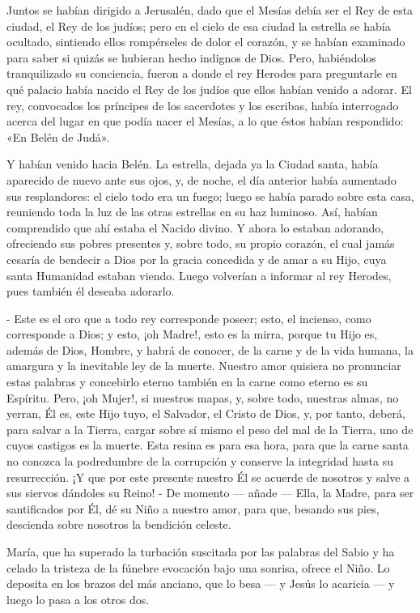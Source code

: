 \documentclass[12pt]{book} %
\begin{document}
Juntos se habían dirigido a Jerusalén, dado que el Mesías debía ser el Rey de esta ciudad, el Rey de los judíos; pero en el cielo de esa ciudad la estrella se había ocultado, sintiendo ellos rompérseles de dolor el corazón, y se habían examinado para saber si quizás se hubieran hecho indignos de Dios. Pero, habiéndolos tranquilizado su conciencia, fueron a donde el rey Herodes para preguntarle en qué palacio había nacido el Rey de los judíos que ellos habían venido a adorar. El rey, convocados los príncipes de los sacerdotes y los escribas, había interrogado acerca del lugar en que podía nacer el Mesías, a lo que éstos habían respondido: «En Belén de Judá». 

Y habían venido hacia Belén. La estrella, dejada ya la Ciudad santa, había aparecido de nuevo ante sus ojos, y, de noche, el día anterior había aumentado sus resplandores: el cielo todo era un fuego; luego se había parado sobre esta casa, reuniendo toda la luz de las otras estrellas en su haz luminoso. Así, habían comprendido que ahí estaba el Nacido divino. Y ahora lo estaban adorando, ofreciendo sus pobres presentes y, sobre todo, su propio corazón, el cual jamás cesaría de bendecir a Dios por la gracia concedida y de amar a su Hijo, cuya santa Humanidad estaban viendo. Luego volverían a informar al rey Herodes, pues también él deseaba adorarlo. 

- Este es el oro que a todo rey corresponde poseer; esto, el incienso, como corresponde a Dios; y esto, ¡oh Madre!, esto es la mirra, porque tu Hijo es, además de Dios, Hombre, y habrá de conocer, de la carne y de la vida humana, la amargura y la inevitable ley de la muerte. Nuestro amor quisiera no pronunciar estas palabras y concebirlo eterno también en la carne como eterno es su Espíritu. Pero, ¡oh Mujer!, si nuestros mapas, y, sobre todo, nuestras almas, no yerran, Él es, este Hijo tuyo, el Salvador, el Cristo de Dios, y, por tanto, deberá, para salvar a la Tierra, cargar sobre sí mismo el peso del mal de la Tierra, uno de cuyos castigos es la muerte. Esta resina es para esa hora, para que la carne santa no conozca la podredumbre de la corrupción y conserve la integridad hasta su resurrección. ¡Y que por este presente nuestro Él se acuerde de nosotros y salve a sus siervos dándoles su Reino! - De momento — añade — Ella, la Madre, para ser santificados por Él, dé su Niño a nuestro amor, para que, besando sus pies, descienda sobre nosotros la bendición celeste. 

María, que ha superado la turbación suscitada por las palabras del Sabio y ha celado la tristeza de la fúnebre evocación bajo una sonrisa, ofrece el Niño. Lo deposita en los brazos del más anciano, que lo besa — y Jesús lo acaricia — y luego lo pasa a los otros dos. 
\end{document}
